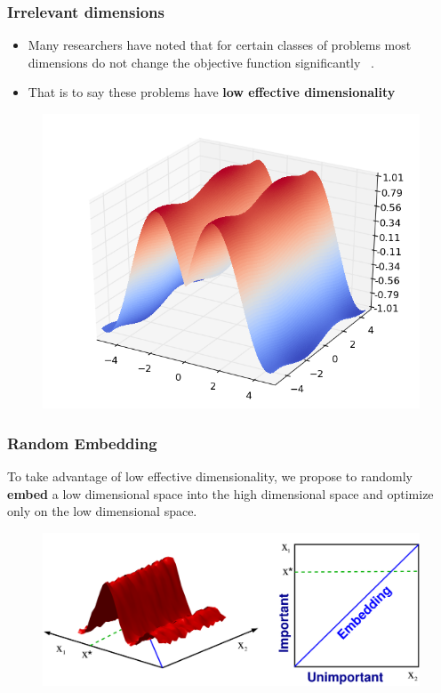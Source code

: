 \documentclass[grey]{beamer}
\begin{document}
 \begin{frame}
   \frametitle{Irrelevant dimensions}
    \begin{minipage}[l]{0.5\columnwidth}
     \begin{itemize}
      \item Many researchers have noted that for certain classes of problems 
       most dimensions do not change the objective function significantly
       ~\cite{Bergstra:2012,Hutter:2013_KeyParameters}.
      \item That is to say these problems have 
       {\bf \textcolor{myColor}{low effective dimensionality}}
     \end{itemize}

    \end{minipage}
    \begin{minipage}[r]{0.485\columnwidth}
     \begin{figure}[t]
      \includegraphics[width = 1.2\columnwidth]
      {./figs/irrelevant}
      \label{fig:ESSL_BLR}
     \end{figure}
    \end{minipage}
  \end{frame}

 \begin{frame}
  \frametitle{Random Embedding}
  To take advantage of low effective dimensionality, we propose to 
  randomly {\bf \textcolor{myColor}{embed}} 
  a low dimensional space into the high dimensional space and optimize
  only on the low dimensional space.
  \begin{figure}[t]
   \includegraphics[width = 0.9\columnwidth]
   {../paper/figures/2to1embedding}
   \label{fig:ESSL_BLR}
  \end{figure}
 \end{frame}
 
\end{document}
